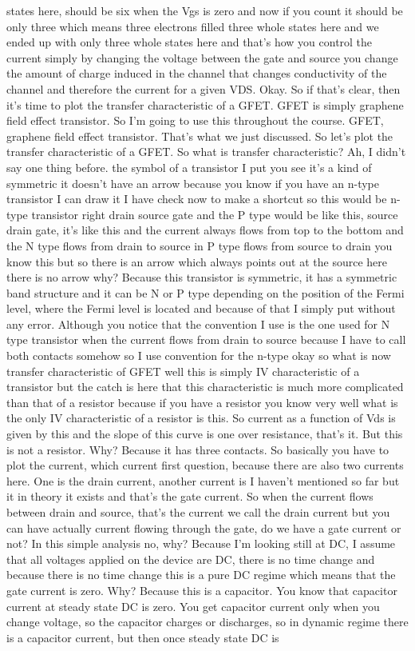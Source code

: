 states here, should be six when the Vgs is zero and now if you count it should be only three which means three electrons filled three whole states here and we ended up with only three whole states here and that's how you control the current simply by changing the voltage between the gate and source you change the amount of charge induced in the channel that changes conductivity of the channel and therefore the current for a given VDS. Okay. So if that's clear, then it's time to plot the transfer characteristic of a GFET.
GFET is simply graphene field effect transistor. So I'm going to use this throughout the course. GFET, graphene field effect transistor. That's what we just discussed. So let's plot the transfer characteristic of a GFET. So what is transfer characteristic? Ah, I didn't say one thing before. the symbol of a transistor I put you see it's a kind of symmetric it doesn't have an arrow because you know if you have an n-type transistor I can draw it I have check now to make a shortcut so this would be n-type transistor right drain source gate and the P type would be like this, source drain gate, it's like this and the current always flows from top to the bottom and the N type flows from drain to source in P type flows from source to drain you know this but so there is an arrow which always points out at the source here there is no arrow why? Because this transistor is symmetric, it has a symmetric band structure and it can be N or P type depending on the position of the Fermi level, where the Fermi level is located and because of that I simply put without any error. Although you notice that the convention I use is the one used for N type transistor when the current flows from drain to source because I have to call both contacts somehow so I use convention for the n-type okay so what is now transfer characteristic of GFET well this is simply IV characteristic of a transistor but the catch is here that this characteristic is much more complicated than that of a resistor because if you have a resistor you know very well what is the only IV characteristic of a resistor is this. So current as a function of Vds is given by this and the slope of this curve is one over resistance, that's it. But this is not a resistor. Why? Because it has three contacts. So basically you have to plot the current, which current first question, because there are also two currents here. One is the drain current, another current is I haven't mentioned so far but it in theory it exists and that's the gate current. So when the current flows between drain and source, that's the current we call the drain current but you can have actually current flowing through the gate, do we have a gate current or not? In this simple analysis no, why? Because I'm looking still at DC, I assume that all voltages applied on the device are DC, there is no time change and because there is no time change this is a pure DC regime which means that the gate current is zero. Why? Because this is a capacitor. You know that capacitor current at steady state DC is zero. You get capacitor current only when you change voltage, so the capacitor charges or discharges, so in dynamic regime there is a capacitor current, but then once steady state DC is 